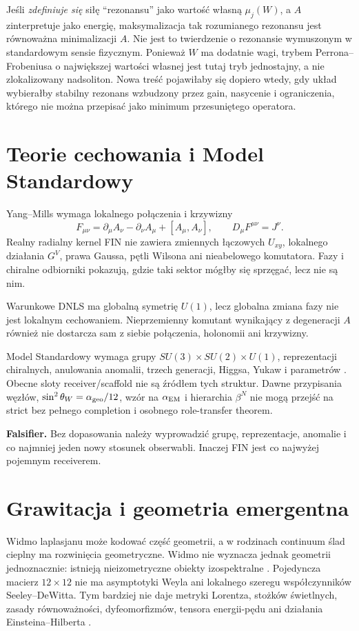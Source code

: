 \documentclass[11pt,a4paper]{article}
\begin{document}
Jeśli \emph{zdefiniuje się} siłę ``rezonansu'' jako wartość własną $\mu_j(W)$, a $A$ zinterpretuje jako energię, maksymalizacja tak rozumianego rezonansu jest równoważna minimalizacji $A$. Nie jest to twierdzenie o rezonansie wymuszonym w standardowym sensie fizycznym. Ponieważ $W$ ma dodatnie wagi, trybem Perrona--Frobeniusa o największej wartości własnej jest tutaj tryb jednostajny, a nie zlokalizowany nadsoliton. Nowa treść pojawiłaby się dopiero wtedy, gdy układ wybierałby stabilny rezonans wzbudzony przez gain, nasycenie i ograniczenia, którego nie można przepisać jako minimum przesuniętego operatora.

\section{Teorie cechowania i Model Standardowy}

Yang--Mills wymaga lokalnego połączenia i krzywizny \cite{YangMills}
\[
F_{\mu\nu}=\partial_\mu A_\nu-\partial_\nu A_\mu+[A_\mu,A_\nu],
\qquad D_\mu F^{\mu\nu}=J^\nu.
\]
Realny radialny kernel FIN nie zawiera zmiennych łączowych $U_{xy}$, lokalnego działania $G^V$, prawa Gaussa, pętli Wilsona ani nieabelowego komutatora. Fazy i chiralne odbiorniki pokazują, gdzie taki sektor mógłby się sprzęgać, lecz nie są nim.

Warunkowe DNLS ma globalną symetrię $U(1)$, lecz globalna zmiana fazy nie jest lokalnym cechowaniem. Nieprzemienny komutant wynikający z degeneracji $A$ również nie dostarcza sam z siebie połączenia, holonomii ani krzywizny.

Model Standardowy wymaga grupy $SU(3)\times SU(2)\times U(1)$, reprezentacji chiralnych, anulowania anomalii, trzech generacji, Higgsa, Yukaw i parametrów \cite{Weinberg}. Obecne sloty receiver/scaffold nie są źródłem tych struktur. Dawne przypisania węzłów, $\sin^2\theta_W=\alpha_{\rm geo}/12$, wzór na $\alpha_{\rm EM}$ i hierarchia $\beta^N$ nie mogą przejść na strict bez pełnego completion i osobnego role-transfer theorem.

\textbf{Falsifier.} Bez dopasowania należy wyprowadzić grupę, reprezentacje, anomalie i co najmniej jeden nowy stosunek obserwabli. Inaczej FIN jest co najwyżej pojemnym receiverem.

\section{Grawitacja i geometria emergentna}

Widmo laplasjanu może kodować część geometrii, a w rodzinach continuum ślad cieplny ma rozwinięcia geometryczne. Widmo nie wyznacza jednak geometrii jednoznacznie: istnieją nieizometryczne obiekty izospektralne \cite{GordonWebbWolpert}. Pojedyncza macierz $12\times12$ nie ma asymptotyki Weyla ani lokalnego szeregu współczynników Seeley--DeWitta. Tym bardziej nie daje metryki Lorentza, stożków świetlnych, zasady równoważności, dyfeomorfizmów, tensora energii-pędu ani działania Einsteina--Hilberta \cite{Einstein}.
\end{document}

